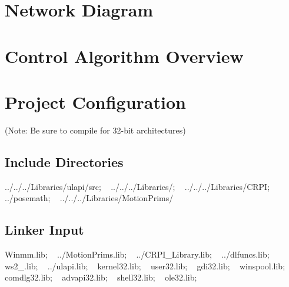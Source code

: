 \hypertarget{index_network}{}\section{Network Diagram}\label{index_network}
 \hypertarget{index_overview}{}\section{Control Algorithm Overview}\label{index_overview}
    \hypertarget{index_config}{}\section{Project Configuration}\label{index_config}
(Note\+: Be sure to compile for 32-\/bit architectures) \hypertarget{index_incl}{}\subsection{Include Directories}\label{index_incl}
../../../\+Libraries/ulapi/src; ~\newline
../../../\+Libraries/; ~\newline
../../../\+Libraries/\+C\+R\+PI; ~\newline
../posemath; ~\newline
../../../\+Libraries/\+Motion\+Prims/ ~\newline
~\newline
\hypertarget{index_lnk}{}\subsection{Linker Input}\label{index_lnk}
Winmm.\+lib; ~\newline
../\+Motion\+Prims.lib; ~\newline
../\+C\+R\+P\+I\+\_\+\+Library.lib; ~\newline
../dlfuncs.lib; ~\newline
ws2\+\_.\+lib; ~\newline
../ulapi.lib; ~\newline
kernel32.\+lib; ~\newline
user32.\+lib; ~\newline
gdi32.\+lib; ~\newline
winspool.\+lib; ~\newline
comdlg32.\+lib; ~\newline
advapi32.\+lib; ~\newline
shell32.\+lib; ~\newline
ole32.\+lib; ~\newline
